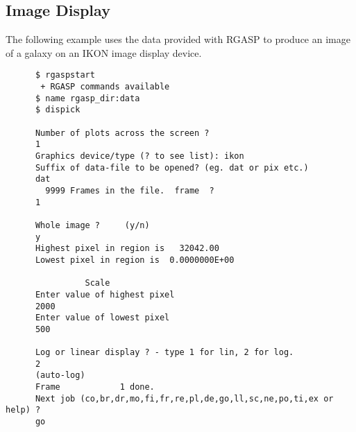 \subsection{Image Display}

The following example uses the data provided with RGASP to produce an image of
a galaxy on an IKON image display device.

\begin{verbatim}
      $ rgaspstart
       + RGASP commands available
      $ name rgasp_dir:data                                                 
      $ dispick                                                             
                                                                            
      Number of plots across the screen ?                                   
      1                                                                     
      Graphics device/type (? to see list): ikon
      Suffix of data-file to be opened? (eg. dat or pix etc.)               
      dat                                                                   
        9999 Frames in the file.  frame  ?                                  
      1                                                                     
                                                                            
      Whole image ?     (y/n)                                               
      y                                                                     
      Highest pixel in region is   32042.00                                 
      Lowest pixel in region is  0.0000000E+00                              
                                                                            
                Scale                                                       
      Enter value of highest pixel                                          
      2000                                                                  
      Enter value of lowest pixel                                           
      500                                                                   
                                                                            
      Log or linear display ? - type 1 for lin, 2 for log.                  
      2                                                                     
      (auto-log)                                                            
      Frame            1 done.                                              
      Next job (co,br,dr,mo,fi,fr,re,pl,de,go,ll,sc,ne,po,ti,ex or help) ?  
      go                                                                    
                                                                            

\end{verbatim}
